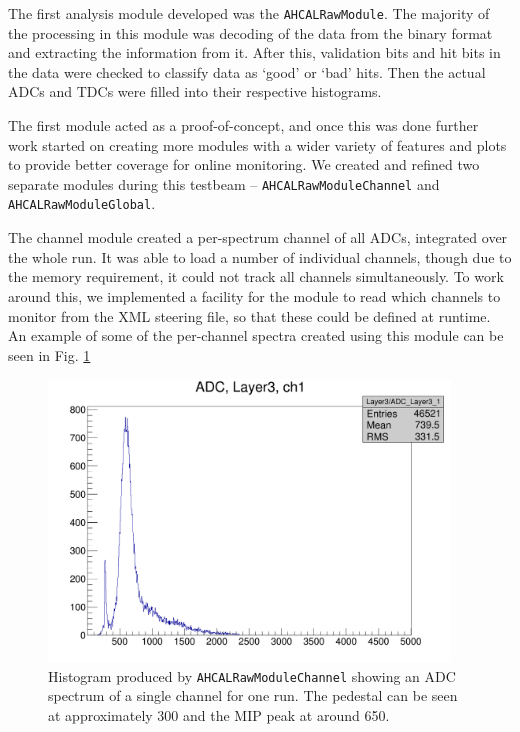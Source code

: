 The first analysis module developed was the \texttt{AHCALRawModule}. The majority of the processing in this module was decoding of the data from the binary format and extracting the information from it. After this, validation bits and hit bits in the data were checked to classify data as `good' or `bad' hits. Then the actual \acrshort{ADC}s and \acrshort{TDC}s were filled into their respective histograms. 

The first module acted as a proof-of-concept, and once this was done further work started on creating more modules with a wider variety of features and plots to provide better coverage for online monitoring. We created and refined two separate modules during this testbeam -- \texttt{AHCALRawModuleChannel} and \texttt{AHCALRawModuleGlobal}. 

The channel module created a per-spectrum channel of all \acrshort{ADC}s, integrated over the whole run. It was able to load a number of individual channels, though due to the memory requirement, it could not track all channels simultaneously. To work around this, we implemented a facility for the module to read which channels to monitor from the \acrshort{XML} steering file, so that these could be defined at runtime. An example of some of the per-channel spectra created using this module can be seen in Fig. \ref{figure:aida/may2016/channelmodule}

\begin{figure}[p]
	\centering
	\includegraphics[width=0.95\textwidth]{../Pictures/ChannelModule-May2016.png} %
	\caption{Histogram produced by \texttt{AHCALRawModuleChannel} showing an \acrshort{ADC} spectrum of a single channel for one run. The pedestal can be seen at approximately 300 and the \acrshort{MIP} peak at around 650.}
	\label{figure:aida/may2016/channelmodule}
\end{figure}

